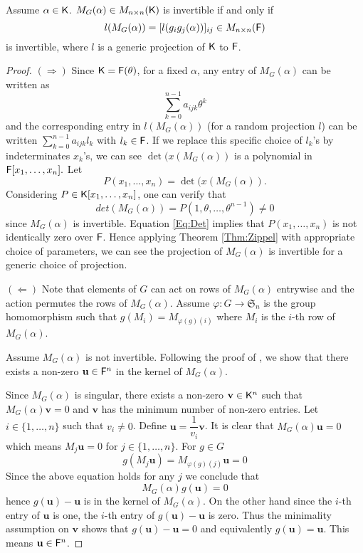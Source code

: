\begin{lemma}\label{Lem:Proj}
Assume $\alpha \in {\mathsf{K}}$. $M_G(\alpha) \in M_{n \times n}({\mathsf{K}})$ 
is invertible if and only if $$l(M_G(\alpha)) =  [l(g_ig_j(\alpha))]_{ij}  \in M_{n \times n}({\mathsf{F}})$$ is invertible,
 where $l$ is a generic projection of ${\mathsf{K}}$ to ${\mathsf{F}}$.
\end{lemma}

\begin{proof}
$(\Rightarrow)$ Since ${\mathsf{K}} = {\mathsf{F}}(\theta)$, for a fixed $\alpha$, any entry of $M_G(\alpha)$ can be written as 
\begin{equation}\label{Eq:PrimElm}
\sum_{k= 0}^{n-1} a_{ijk}\theta^k
\end{equation}
 and the corresponding entry in $l(M_G(\alpha))$ (for a random projection $l$)
 can be written $\sum_{k= 0}^{n-1} a_{ijk}l_k$ with $l_k\in {\mathsf{F}}$. If we replace this specific choice of $l_k$'s by 
 indeterminates $x_k$'s, we can see $\det(x(M_G(\alpha))$ is a polynomial in ${\mathsf{F}}[x_1, \ldots, x_n].$ Let 
 $$P(x_1, \ldots, x_n) = \det(x(M_G(\alpha)).$$ 
 Considering $P \in {\mathsf{K}}[x_1, \ldots , x_n]$, one can verify that 
 \begin{equation}\label{Eq:Det}
 det(M_G(\alpha))= P(1, \theta, \ldots, \theta^{n-1}) \neq 0
 \end{equation}
 since $M_G(\alpha)$ is invertible. Equation \ref{Eq:Det} implies that $P(x_1, \ldots, x_n)$ is not identically zero over ${\mathsf{F}}$. Hence applying Theorem \ref{Thm:Zippel} with appropriate choice of parameters, we can see 
 the projection of $M_G(\alpha)$ is invertible for a generic choice of projection. 
 
 $(\Leftarrow)$  Note that elements of $G$ can act on 
 rows of $M_G(\alpha)$ entrywise and the action permutes the rows of $M_G(\alpha)$. Assume $\varphi : G \longrightarrow \mathfrak{S}_n$ is the group homomorphism 
 such that $g(M_i) = M_{\varphi(g)(i)}$ where $M_i$ is the $i$-th row of $M_G(\alpha)$.
 
 Assume $M_G(\alpha)$ is not invertible. Following the proof of \cite[Lemma 4]{Armin}, we show that there exists a non-zero $\textbf{u} \in {\mathsf{F}}^n$ in the kernel of $M_G(\alpha)$. 
 
 Since $M_G(\alpha)$ is singular, there exists a non-zero $\textbf{v} \in {\mathsf{K}}^n$  such that $M_G(\alpha)\textbf{v} = 0$ and $\textbf{v}$ has the minimum number of non-zero entries. Let $i \in  \lbrace 1, \ldots , n \rbrace$ such that $v_i \neq 0$. Define $\textbf{u} = \dfrac{1}{v_i}\textbf{v}$. It is clear  that $M_G(\alpha)\textbf{u} = 0$ which means $M_j \textbf{u} = 0 $ for $j \in \lbrace 1, \ldots, n \rbrace$. For $g \in G$
 \begin{equation}
  g(M_j \textbf{u}) = M_{\varphi(g)(j)} \textbf{u}= 0
 \end{equation}
 Since the above equation holds for any $j$ we conclude that $$M_G(\alpha)g(\textbf{u})= 0$$ hence
 $g(\textbf{u})-\textbf{u}$ is in the kernel of $M_G(\alpha)$. On the other hand since the $i$-th entry 
 of $\textbf{u}$ is one, the $i$-th entry of $g(\textbf{u}) -\textbf{u}$ is zero. Thus the minimality assumption
 on $\textbf{v}$ shows that $g(\textbf{u}) -\textbf{u} = 0$ and equivalently $g(\textbf{u})=\textbf{u}$. This 
 means $\textbf{u} \in {\mathsf{F}}^n$.
 

\end{proof}
